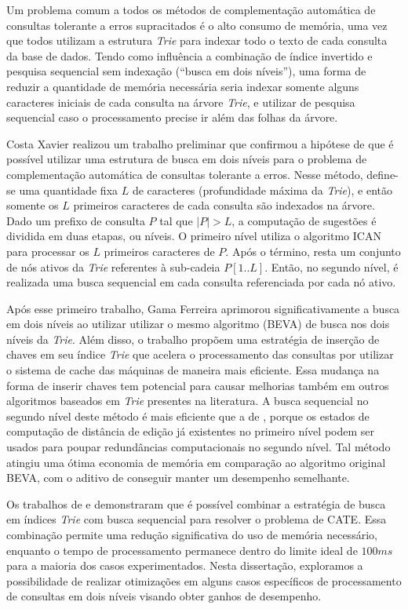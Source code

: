 Um problema comum a todos os métodos de complementação automática de consultas tolerante a erros supracitados é o alto consumo de memória, uma vez que todos utilizam a estrutura \textit{Trie} para indexar todo o texto de cada consulta da base de dados. Tendo como influência a combinação de índice invertido e pesquisa sequencial sem indexação (``busca em dois níveis''), uma forma de reduzir a quantidade de memória necessária seria indexar somente alguns caracteres iniciais de cada consulta na árvore \textit{Trie}, e utilizar de pesquisa sequencial caso o processamento precise ir além das folhas da árvore. 

Costa Xavier \citep{xavier2019} realizou um trabalho preliminar que confirmou a hipótese de que é possível utilizar uma estrutura de busca em dois níveis para o problema de complementação automática de consultas tolerante a erros. Nesse método, define-se uma quantidade fixa $L$ de caracteres (profundidade máxima da \textit{Trie}), e então somente os $L$ primeiros caracteres de cada consulta são indexados na árvore. Dado um prefixo de consulta $P$ tal que $|P| > L$, a computação de sugestões é dividida em duas etapas, ou níveis. O primeiro nível utiliza o algoritmo ICAN \citep{ji2009efficient} para processar os $L$ primeiros caracteres de $P$. Após o término, resta um conjunto de nós ativos da \textit{Trie} referentes à sub-cadeia  $P[1..L]$. Então, no segundo nível, é realizada uma busca sequencial em cada consulta referenciada por cada nó ativo. 

Após esse primeiro trabalho, Gama Ferreira \citep{berg2020} aprimorou significativamente a busca em dois níveis ao utilizar utilizar o mesmo algoritmo (BEVA) de busca nos dois níveis da \textit{Trie}. Além disso, o trabalho propõem uma estratégia de inserção de chaves em seu índice \textit{Trie} que acelera o processamento das consultas por utilizar o sistema de cache das máquinas de maneira mais eficiente. Essa mudança na forma de inserir chaves tem potencial para causar melhorias também em outros algoritmos baseados em \textit{Trie} presentes na literatura. A busca sequencial no segundo nível deste método é mais eficiente que a de \cite{xavier2019}, porque os estados de computação de distância de edição já existentes no primeiro nível podem ser usados para poupar redundâncias computacionais no segundo nível. Tal método atingiu uma ótima economia de memória em comparação ao algoritmo original BEVA, com o aditivo de conseguir manter um desempenho semelhante. 

Os trabalhos de \cite{xavier2019} e \cite{berg2020} demonstraram que é possível combinar a estratégia de busca em índices \textit{Trie} com busca sequencial para resolver o problema de CATE. Essa combinação permite uma redução significativa do uso de memória necessário, enquanto o tempo de processamento permanece dentro do limite ideal de $100ms$ para a maioria dos casos experimentados. Nesta dissertação, exploramos a possibilidade de realizar otimizações em alguns casos específicos de processamento de consultas em dois níveis visando obter ganhos de desempenho.
